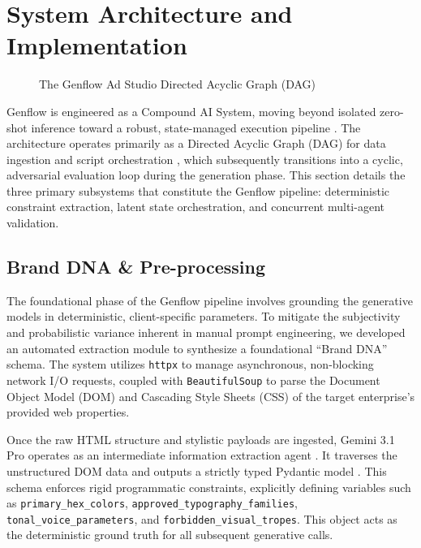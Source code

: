 \documentclass[sigconf,authordraft]{acmart}
\begin{document}
\section{System Architecture and Implementation}

\begin{figure}[htbp]
  \centering
  \caption{The Genflow Ad Studio Directed Acyclic Graph (DAG)}
  \label{fig:dag}
\end{figure}

Genflow is engineered as a Compound AI System, moving beyond isolated zero-shot inference toward a robust, state-managed execution pipeline \cite{wu2023autogen}. The architecture operates primarily as a Directed Acyclic Graph (DAG) for data ingestion and script orchestration \cite{khattab2024dspy, chase2023langchain}, which subsequently transitions into a cyclic, adversarial evaluation loop during the generation phase. This section details the three primary subsystems that constitute the Genflow pipeline: deterministic constraint extraction, latent state orchestration, and concurrent multi-agent validation.

\subsection{Brand DNA \& Pre-processing}

The foundational phase of the Genflow pipeline involves grounding the generative models in deterministic, client-specific parameters. To mitigate the subjectivity and probabilistic variance inherent in manual prompt engineering, we developed an automated extraction module to synthesize a foundational ``Brand DNA'' schema. The system utilizes \texttt{httpx} to manage asynchronous, non-blocking network I/O requests, coupled with \texttt{BeautifulSoup} to parse the Document Object Model (DOM) and Cascading Style Sheets (CSS) of the target enterprise's provided web properties.

Once the raw HTML structure and stylistic payloads are ingested, Gemini 3.1 Pro operates as an intermediate information extraction agent \cite{li2024structured}. It traverses the unstructured DOM data and outputs a strictly typed Pydantic model \cite{pydantic2025}. This schema enforces rigid programmatic constraints, explicitly defining variables such as \texttt{primary\_hex\_colors}, \texttt{approved\_typography\_families}, \texttt{tonal\_voice\_parameters}, and \texttt{forbidden\_visual\_tropes}. This object acts as the deterministic ground truth for all subsequent generative calls.
\end{document}
